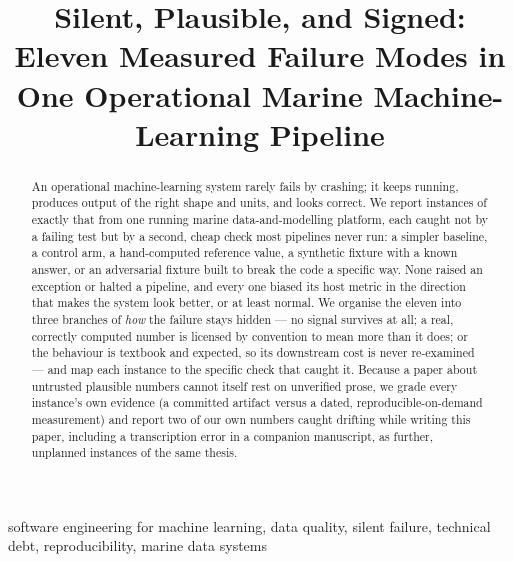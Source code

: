 \documentclass[conference]{IEEEtran}
\begin{document}
\title{Silent, Plausible, and Signed: Eleven Measured Failure Modes in One
Operational Marine Machine-Learning Pipeline}

\author{
}

\maketitle

\begin{abstract}
An operational machine-learning system rarely fails by crashing; it keeps
running, produces output of the right shape and units, and looks correct. We
report \NInstances{} instances of exactly that from one running marine
data-and-modelling platform, each caught not by a failing test but by a
second, cheap check most pipelines never run: a simpler baseline, a control
arm, a hand-computed reference value, a synthetic fixture with a known
answer, or an adversarial fixture built to break the code a specific way.
None raised an exception or halted a pipeline, and every one biased its host
metric in the direction that makes the system look better, or at least
normal. We organise the eleven into three branches of \emph{how}
the failure stays hidden --- no signal survives at all; a real, correctly
computed number is licensed by convention to mean more than it does; or the
behaviour is textbook and expected, so its downstream cost is never
re-examined --- and map each instance to the specific check that caught it.
Because a paper about untrusted plausible numbers cannot itself rest on
unverified prose, we grade every instance's own evidence (a committed
artifact versus a dated, reproducible-on-demand measurement) and report two
of our own numbers caught drifting while writing this paper, including a
transcription error in a companion manuscript, as further,
unplanned instances of the same thesis.
\end{abstract}

\begin{IEEEkeywords}
software engineering for machine learning, data quality, silent failure,
technical debt, reproducibility, marine data systems
\end{IEEEkeywords}


\end{document}

